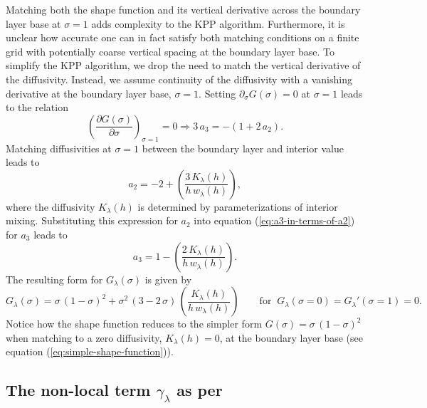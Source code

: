 Matching both the shape function and its vertical derivative across
the boundary layer base at $\sigma=1$ adds complexity to the KPP
algorithm.  Furthermore, it is unclear how accurate one can in fact
satisfy both matching conditions on a finite grid with potentially
coarse vertical spacing at the boundary layer base.  To simplify the
KPP algorithm, we drop the need to match the vertical derivative of
the diffusivity.  Instead, we assume continuity of the diffusivity
with a vanishing derivative at the boundary layer base, $\sigma=1$.
Setting $\partial_{\sigma} G(\sigma) = 0$ at $\sigma=1$ leads to the
relation
\begin{equation}
 \left( \frac{\partial  G(\sigma)}{\partial \sigma} \right)_{\sigma =1} = 0 \Longrightarrow   3 \, a_{3} = -(1+ 2 \, a_{2}). 
\label{eq:a3-in-terms-of-a2}
\end{equation}
Matching diffusivities at $\sigma=1$ between the boundary layer and
interior value leads to
\begin{equation}
  a_{2}  = -2 + \left(\frac{3 \, K_{\lambda}(h)}{h \, w_{\lambda}(h)}
  \right),
\label{eq:a2-specified}
\end{equation}
where the diffusivity $K_{\lambda}(h)$ is determined by
parameterizations of interior mixing.  Substituting this expression
for $a_{2}$ into equation (\ref{eq:a3-in-terms-of-a2}) for $a_{3}$
leads to
\begin{equation}
 a_{3} = 1 - \left(\frac{2 \, K_{\lambda}(h)}{h \, w_{\lambda}(h)} \right).
\end{equation}
The resulting form for $G_{\lambda}(\sigma)$ is given by 
\begin{equation}
  G_{\lambda}(\sigma) = \sigma \, (1-\sigma)^{2}+ \sigma^{2} \,  (3 - 2 \, \sigma) \, \left(\frac{K_{\lambda}(h)}{h \, w_{\lambda}(h)} \right)
  \qquad \mbox{for} \; \; G_{\lambda}(\sigma=0) = G_{\lambda}'(\sigma=1) = 0. 
\end{equation}
Notice how the shape function reduces to the simpler form
$G(\sigma) = \sigma \, (1-\sigma)^{2}$ when matching to a zero
diffusivity, $K_{\lambda}(h) = 0$, at the boundary layer base (see
equation (\ref{eq:simple-shape-function})).


\subsection{The non-local term $\gamma_{\lambda}$ as per \cite{LargeKPP}}
\label{subsection:kpp-non-local-transport}


